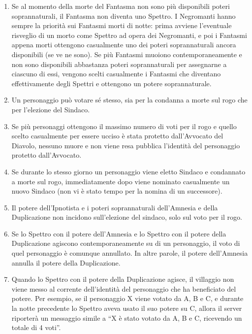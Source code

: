 \documentclass[a4paper,10pt]{article}
\begin{document}
\begin{enumerate}
 \item Se al momento della morte del Fantasma non sono più disponibili poteri soprannaturali, il Fantasma non diventa uno Spettro.
 I Negromanti hanno sempre la priorità sui Fantasmi morti di notte: prima avviene l'eventuale risveglio di un morto come Spettro ad opera dei Negromanti, e poi i Fantasmi appena morti ottengono casualmente uno dei poteri soprannaturali ancora disponibili (se ve ne sono).
 Se più Fantasmi muoiono contemporaneamente e non sono disponibili abbastanza poteri soprannaturali per assegnarne a ciascuno di essi, vengono scelti casualmente i Fantasmi che diventano effettivamente degli Spettri e ottengono un potere soprannaturale.
 
 \item Un personaggio può votare sé stesso, sia per la condanna a morte sul rogo che per l'elezione del Sindaco.
 
 \item Se più personaggi ottengono il massimo numero di voti per il rogo e quello scelto casualmente per essere ucciso è stata protetto dall'Avvocato del Diavolo, nessuno muore e non viene resa pubblica l'identità del personaggio protetto dall'Avvocato.
 
 \item Se durante lo stesso giorno un personaggio viene eletto Sindaco e condannato a morte sul rogo, immediatamente dopo viene nominato casualmente un nuovo Sindaco (non vi è stato tempo per la nomina di un successore).
 
 \item Il potere dell'Ipnotista e i poteri soprannaturali dell'Amnesia e della Duplicazione non incidono sull'elezione del sindaco, solo sul voto per il rogo.
 
 \item Se lo Spettro con il potere dell'Amnesia e lo Spettro con il potere della Duplicazione agiscono contemporaneamente su di un personaggio, il voto di quel personaggio è comunque annullato. In altre parole, il potere dell'Amnesia annulla il potere della Duplicazione.
 
 \item Quando lo Spettro con il potere della Duplicazione agisce, il villaggio non viene messo al corrente dell'identità del personaggio che ha beneficiato del potere. Per esempio, se il personaggio X viene votato da A, B e C, e durante la notte precedente lo Spettro aveva usato il suo potere su C, allora il server riporterà un messaggio simile a ``X è stato votato da A, B e C, ricevendo un totale di 4 voti''.
 

\end{enumerate}
\end{document}
